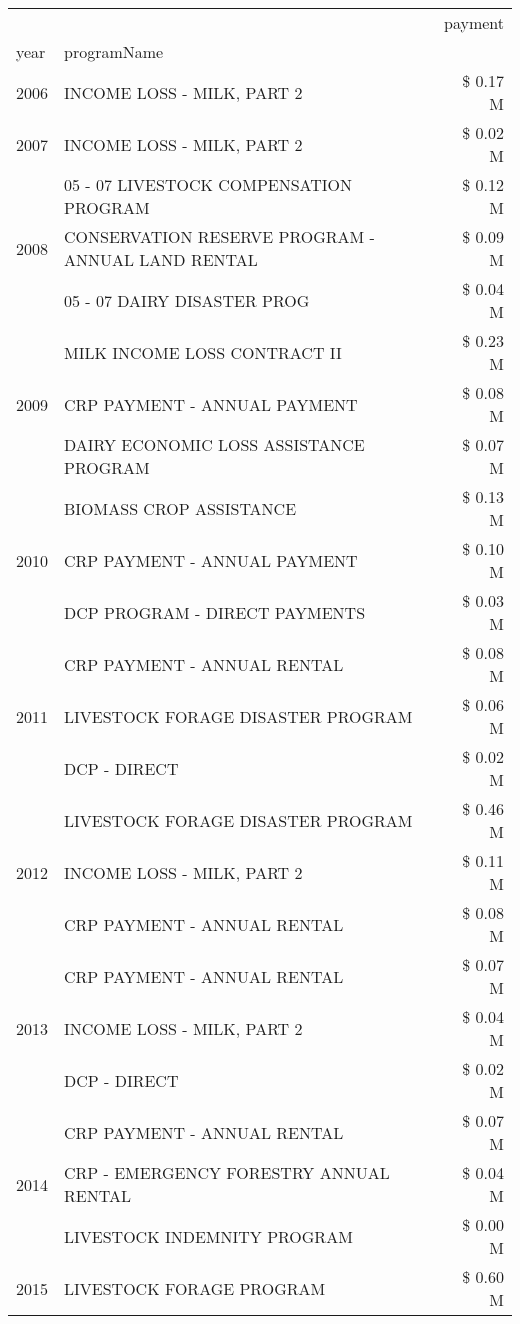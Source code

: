 \begin{tabular}{llr}
\toprule
 &  & payment \\
year & programName &  \\
\midrule
2006 & INCOME LOSS - MILK, PART 2 & \$ 0.17 M \\
\cline{1-3}
2007 & INCOME LOSS - MILK, PART 2 & \$ 0.02 M \\
\cline{1-3}
\multirow[t]{3}{*}{2008} & 05 - 07 LIVESTOCK COMPENSATION PROGRAM & \$ 0.12 M \\
 & CONSERVATION RESERVE PROGRAM - ANNUAL LAND RENTAL & \$ 0.09 M \\
 & 05 - 07 DAIRY DISASTER PROG & \$ 0.04 M \\
\cline{1-3}
\multirow[t]{3}{*}{2009} & MILK INCOME LOSS CONTRACT II & \$ 0.23 M \\
 & CRP PAYMENT - ANNUAL PAYMENT & \$ 0.08 M \\
 & DAIRY ECONOMIC LOSS ASSISTANCE PROGRAM & \$ 0.07 M \\
\cline{1-3}
\multirow[t]{3}{*}{2010} & BIOMASS CROP ASSISTANCE & \$ 0.13 M \\
 & CRP PAYMENT - ANNUAL PAYMENT & \$ 0.10 M \\
 & DCP PROGRAM - DIRECT PAYMENTS & \$ 0.03 M \\
\cline{1-3}
\multirow[t]{3}{*}{2011} & CRP PAYMENT - ANNUAL RENTAL & \$ 0.08 M \\
 & LIVESTOCK FORAGE DISASTER PROGRAM & \$ 0.06 M \\
 & DCP - DIRECT & \$ 0.02 M \\
\cline{1-3}
\multirow[t]{3}{*}{2012} & LIVESTOCK FORAGE DISASTER PROGRAM & \$ 0.46 M \\
 & INCOME LOSS - MILK, PART 2 & \$ 0.11 M \\
 & CRP PAYMENT - ANNUAL RENTAL & \$ 0.08 M \\
\cline{1-3}
\multirow[t]{3}{*}{2013} & CRP PAYMENT - ANNUAL RENTAL & \$ 0.07 M \\
 & INCOME LOSS - MILK, PART 2 & \$ 0.04 M \\
 & DCP - DIRECT & \$ 0.02 M \\
\cline{1-3}
\multirow[t]{3}{*}{2014} & CRP PAYMENT - ANNUAL RENTAL & \$ 0.07 M \\
 & CRP - EMERGENCY FORESTRY ANNUAL RENTAL & \$ 0.04 M \\
 & LIVESTOCK INDEMNITY PROGRAM & \$ 0.00 M \\
\cline{1-3}
\multirow[t]{3}{*}{2015} & LIVESTOCK FORAGE PROGRAM & \$ 0.60 M \\

\end{tabular}
